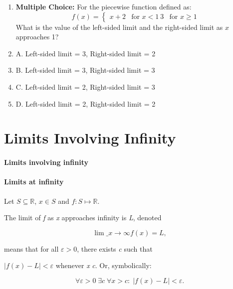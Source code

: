 \begin{enumerate}
    \item \textbf{Multiple Choice:} For the piecewise function defined as: $$ f(x) = \begin{cases} x + 2 & \text{for } x < 1 \   3 & \text{for } x \geq 1 \end{cases} $$ What is the value of the left-sided limit and the right-sided limit as $x$ approaches 1?
    \item A. Left-sided limit = 3, Right-sided limit = 2
    \item B. Left-sided limit = 3, Right-sided limit = 3
    \item C. Left-sided limit = 2, Right-sided limit = 3
    \item D. Left-sided limit = 2, Right-sided limit = 2
\end{enumerate}

\section{Limits Involving Infinity}
\label{sec:limits-involving-infinity}

\paragraph{Limits involving infinity}



\paragraph{Limits at infinity}



Let $S\subseteq\mathbb{R}$, $x\in S$ and $f:S\mapsto\mathbb{R}$.



The limit of \textit{f} as \textit{x} approaches infinity is \textit{L}, denoted



$$\lim\_{x \to \infty}f(x) = L,$$



means that for all $\varepsilon > 0$, there exists \textit{c} such that

$|f(x) - L| < \varepsilon$ whenever \textit{x} \> \textit{c}. Or, symbolically:



$$\forall \varepsilon > 0 \; \exists c \; \forall x > c :\; |f(x) - L| < \varepsilon.$$




